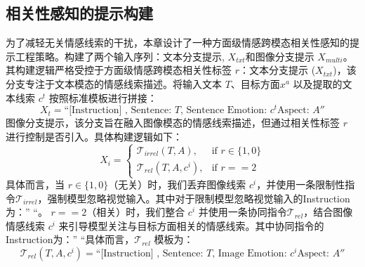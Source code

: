 \subsection{相关性感知的提示构建}
为了减轻无关情感线索的干扰，本章设计了一种方面级情感跨模态相关性感知的提示工程策略。构建了两个输入序列：文本分支提示, $X_{txt}$和图像分支提示 $X_{multi}$。其构建逻辑严格受控于方面级情感跨模态相关性标签 $r$：文本分支提示 ($X_{txt}$)，该分支专注于文本模态的情感线索描述。将输入文本 $T$、目标方面$x^a$ 以及提取的文本线索 $c^t$ 按照标准模板进行拼接：
\begin{equation}
    X_{t} = \text{``[Instruction] }\text{, Sentence: } T  \text{, Sentence Emotion: } c^t \text {Aspect: } A ''
\end{equation}
图像分支提示，该分支旨在融入图像模态的情感线索描述，但通过相关性标签 $r$ 进行控制是否引入。具体构建逻辑如下：
  \begin{equation}
  X_{i} = 
  \begin{cases} 
  \mathcal{T}_{irrel}(T, A), & \text{if } r \in \{1, 0\} \\
  \mathcal{T}_{rel}(T, A, c^i), & \text{if } r==2
  \end{cases}
  \end{equation}
具体而言，当 $r \in \{1, 0\}$（无关）时，我们丢弃图像线索 $c^i $，并使用一条限制性指令$\mathcal{T}_{irrel}$，强制模型忽略视觉输入。其中对于限制模型忽略视觉输入的Instruction为：” “。 $r ==2$（相关）时，我们整合 $c^i $ 并使用一条协同指令$\mathcal{T}_{rel}$，结合图像情感线索 $c^i$ 来引导模型关注与目标方面相关的情感线索。其中协同指令的Instruction为：” “具体而言，$\mathcal{T}_{rel}$ 模板为：  
\begin{equation}
    \mathcal{T}_{rel}(T, A, c^i) = \text{``[Instruction] }\text{, Sentence: } T  \text{, Image Emotion: } c^i \text {Aspect: } A ''
\end{equation}

